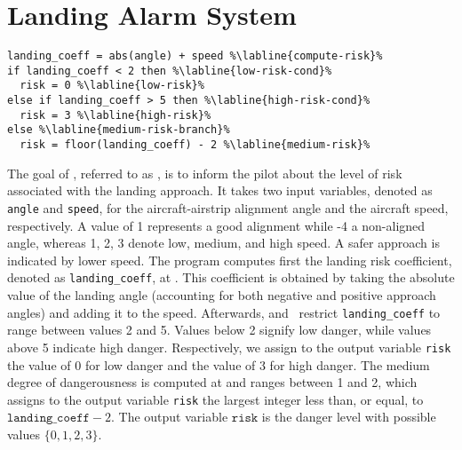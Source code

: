 %

\section{Landing Alarm System}
\newcommand*{\x}{\texttt{angle}}
\newcommand*{\y}{\texttt{speed}}
\newcommand*{\z}{\texttt{risk}}
\newcommand*{\lc}{\texttt{landing\_coeff}}


\begin{lstlisting}[language=customPython,escapechar=\%,label={lst:landing-alarm-system},caption={Program for the landing-risk alarm system.}]
landing_coeff = abs(angle) + speed %\labline{compute-risk}%
if landing_coeff < 2 then %\labline{low-risk-cond}%
  risk = 0 %\labline{low-risk}%
else if landing_coeff > 5 then %\labline{high-risk-cond}%
  risk = 3 %\labline{high-risk}%
else %\labline{medium-risk-branch}%
  risk = floor(landing_coeff) - 2 %\labline{medium-risk}%
\end{lstlisting}


The goal of , referred to as \landingprogram, is to inform the pilot about the level of risk associated with the landing approach.
It takes two input variables, denoted as \x{} and \y, for the aircraft-airstrip alignment angle and the aircraft speed, respectively.
A value of 1 represents a good alignment while -4 a non-aligned angle, whereas 1, 2, 3 denote low, medium, and high speed.
A safer approach is indicated by lower speed.
The program \landingprogram{} computes first the landing risk coefficient, denoted as \lc, at .
This coefficient is obtained by taking the absolute value of the landing angle (accounting for both negative and positive approach angles) and adding it to the speed.
Afterwards,  and~ restrict \lc{} to range between values 2 and 5.
Values below 2 signify low danger, while values above 5 indicate high danger.
Respectively, we assign to the output variable \z{} the value of 0 for low danger and the value of 3 for high danger.
The medium degree of dangerousness is computed at  and ranges between 1 and 2, which assigns to the output variable \z{} the largest integer less than, or equal, to $\lc-2$.
The output variable $\z{}$ is the danger level with possible values $\{0, 1, 2, 3\}$.

